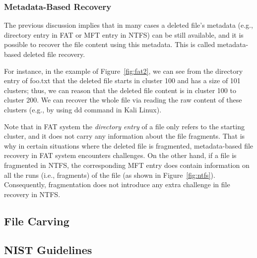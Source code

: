 \subsubsection{Metadata-Based Recovery}\label{subsubsec:meta-recovery}
\begin{paraphrase}
 The previous discussion implies that in many cases a deleted file's metadata 
(e.g., directory entry in FAT or MFT entry in NTFS) can be still available, 
and it is possible to recover the file content using this metadata. 
This is called metadata-based deleted file recovery.

For instance, in the example of Figure~\ref{fig:fat2},
we can see from the directory entry of foo.txt that 
the deleted file starts in cluster 100 and has a size of 101 clusters;
thus, we can reason that the deleted file content is in cluster 100 to cluster 200.
We can recover the whole file via reading the raw content of these clusters (e.g., by using dd command in Kali Linux). 

Note that in FAT system the \emph{directory entry} of a file only refers to the starting cluster, and it does not carry any information about the file fragments.
That is why in certain situations where the deleted file is fragmented, metadata-based file recovery in FAT system encounters challenges.
On the other hand, if a file is fragmented in NTFS, the corresponding MFT entry does contain information on all the runs (i.e., fragments) of the file
(as shown in Figure~\ref{fig:ntfs}). Consequently, fragmentation does not introduce any extra challenge in file recovery in NTFS.
\end{paraphrase}

\subsection{File Carving}\label{subsec:file-carving}


\subsection{NIST Guidelines}
